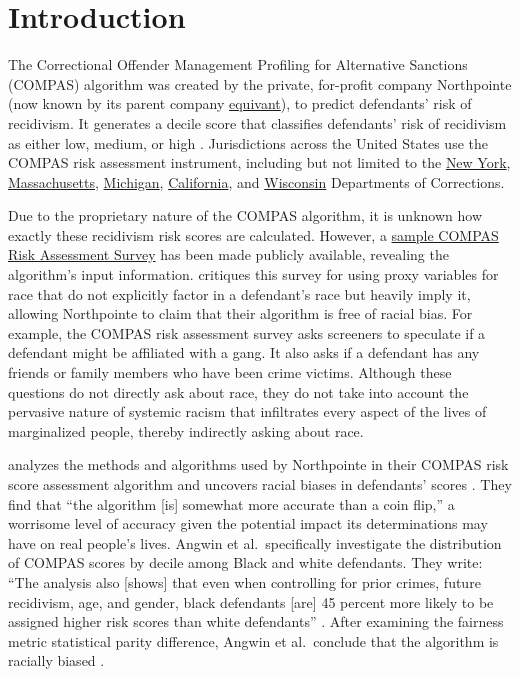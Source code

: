 \documentclass[water,article,submit,moreauthors,pdftex]{mdpi}
\begin{document}

\hypertarget{introduction}{%
\section{Introduction}\label{introduction}}

The Correctional Offender Management Profiling for Alternative Sanctions
(COMPAS) algorithm was created by the private, for-profit company
Northpointe (now known by its parent company
\href{https://www.equivant.com/faq/}{equivant}), to predict defendants'
risk of recidivism. It generates a decile score that classifies
defendants' risk of recidivism as either low, medium, or high
\citep{angwin2016machine}. Jurisdictions across the United States use
the COMPAS risk assessment instrument, including but not limited to the
\href{https://doccs.ny.gov/system/files/documents/2020/11/8500.pdf}{New
York},
\href{https://hdsr.mitpress.mit.edu/pub/hzwo7ax4/release/4}{Massachusetts},
\href{https://hdsr.mitpress.mit.edu/pub/hzwo7ax4/release/4}{Michigan},
\href{https://hdsr.mitpress.mit.edu/pub/hzwo7ax4/release/4}{California},
and \href{https://doc.wi.gov/Pages/AboutDOC/COMPAS.aspx}{Wisconsin}
Departments of Corrections.

Due to the proprietary nature of the COMPAS algorithm, it is unknown how
exactly these recidivism risk scores are calculated. However, a
\href{https://www.documentcloud.org/documents/2702103-Sample-Risk-Assessment-COMPAS-CORE\#document/p5/a296598}{sample
COMPAS Risk Assessment Survey} has been made publicly available,
revealing the algorithm's input information. \citet{angwin2016machine}
critiques this survey for using proxy variables for race that do not
explicitly factor in a defendant's race but heavily imply it, allowing
Northpointe to claim that their algorithm is free of racial bias. For
example, the COMPAS risk assessment survey asks screeners to speculate
if a defendant might be affiliated with a gang. It also asks if a
defendant has any friends or family members who have been crime victims.
Although these questions do not directly ask about race, they do not
take into account the pervasive nature of systemic racism that
infiltrates every aspect of the lives of marginalized people, thereby
indirectly asking about race.

\citet{angwin2016machine} analyzes the methods and algorithms used by
Northpointe in their COMPAS risk score assessment algorithm and uncovers
racial biases in defendants' scores \citep{angwin2016machine}. They find
that ``the algorithm {[}is{]} somewhat more accurate than a coin flip,''
a worrisome level of accuracy given the potential impact its
determinations may have on real people's lives. Angwin et
al.~specifically investigate the distribution of COMPAS scores by decile
among Black and white defendants. They write: ``The analysis also
{[}shows{]} that even when controlling for prior crimes, future
recidivism, age, and gender, black defendants {[}are{]} 45 percent more
likely to be assigned higher risk scores than white defendants''
\citep{larson2016we}. After examining the fairness metric statistical
parity difference, Angwin et al.~conclude that the algorithm is racially
biased \citep{larson2016we}.
\end{document}
